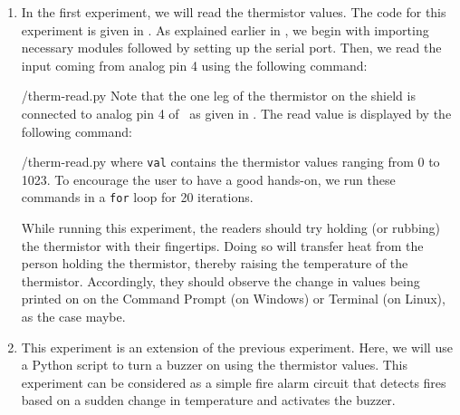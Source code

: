 \begin{enumerate}
  \item In the first experiment, we will read the thermistor values.
        The code for this experiment is given in .
        As explained earlier in , we begin with
        importing necessary modules followed by setting up the serial port.
        Then, we read the input coming from analog pin 4 using the
        following command:
        
        {\LocTHERMpycode/therm-read.py} Note that the one leg of the thermistor on
        the shield is connected to analog pin 4 of \arduino\,
        as given in . The read value is displayed
        by the following command:
        
        {\LocTHERMpycode/therm-read.py} where {\tt val} contains
        the thermistor values ranging from 0 to 1023. To
        encourage the user to have a good hands-on, we run these commands in
        a {\tt for} loop for 20 iterations.

        While running this experiment,
        the readers should try holding (or rubbing) the thermistor with their fingertips.
        Doing so will transfer heat from the person holding the
        thermistor, thereby raising the temperature of the thermistor.
        Accordingly, they should observe the change in values being printed on on the
        Command Prompt (on Windows) or Terminal (on Linux), as the case maybe.


  \item This experiment is an extension of the previous
        experiment. Here, we will use a Python script to
        turn a buzzer on using the thermistor values. This experiment
        can be considered as a simple fire alarm circuit that
        detects fires based on a sudden change in temperature and
        activates the buzzer.


\end{enumerate}
